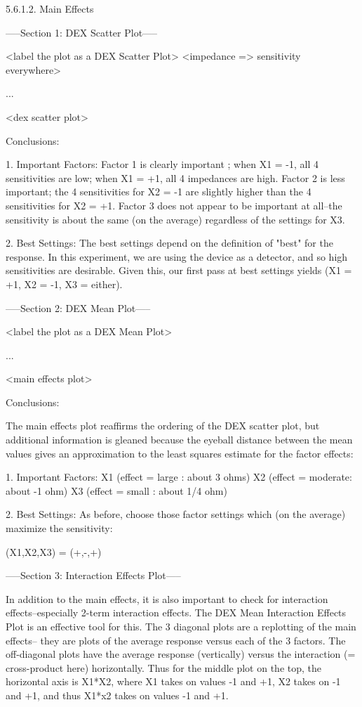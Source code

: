 5.6.1.2. Main Effects


-----Section 1: DEX Scatter Plot-----

<label the plot as a DEX Scatter Plot>
<impedance => sensitivity     everywhere>

...

<dex scatter plot>

Conclusions:

1. Important Factors:
   Factor 1 is clearly important ; when X1 = -1,
   all 4 sensitivities are low; when X1 = +1, all
   4 impedances are high.  Factor 2 is less
   important; the 4 sensitivities for X2 = -1 are
   slightly higher than the 4 sensitivities for X2
   = +1.  Factor 3 does not appear to be important
   at all--the sensitivity is about the same (on
   the average) regardless of the settings for X3.

2. Best Settings:
   The best settings depend on the definition of
   "best" for the response.  In this experiment,
   we are using the device as a detector, and so
   high sensitivities are desirable.  Given this,
   our first pass at best settings yields (X1 =
   +1, X2 = -1, X3 = either).

-----Section 2: DEX Mean Plot-----

<label the plot as a DEX Mean Plot>

...

<main effects plot>

Conclusions:

The main effects plot reaffirms the ordering of
the DEX scatter plot, but additional information is
gleaned because the eyeball distance between the
mean values gives an approximation to the least
squares estimate for the factor effects:

1. Important Factors:
   X1 (effect = large   : about 3 ohms)
   X2 (effect = moderate: about -1 ohm)
   X3 (effect = small   : about 1/4 ohm)

2. Best Settings:
   As before, choose those factor settings which
   (on the average) maximize the sensitivity:

      (X1,X2,X3) = (+,-,+)

-----Section 3: Interaction Effects Plot-----

In addition to the main effects, it is also
important to check for interaction
effects--especially 2-term interaction effects.
The DEX Mean Interaction Effects Plot is an
effective tool for this.  The 3 diagonal plots are
a replotting of the main effects-- they are plots
of the average response versus each of the 3
factors.  The off-diagonal plots have the average
response (vertically) versus the interaction (=
cross-product here) horizontally.  Thus for the
middle plot on the top, the horizontal axis is
X1*X2, where X1 takes on values -1 and +1, X2
takes on -1 and +1, and thus X1*x2 takes on values
-1 and +1.

